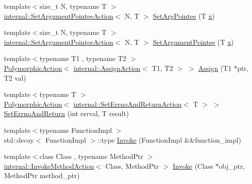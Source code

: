 \begin{DoxyCompactItemize}
\item 
{\footnotesize template$<$size\+\_\+t N, typename T $>$ }\\\mbox{\hyperlink{structtesting_1_1internal_1_1_set_argument_pointee_action}{internal\+::\+Set\+Argument\+Pointee\+Action}}$<$ N, T $>$ \mbox{\hyperlink{namespacetesting_a6dbe77dc170c495ea300dd9d74ed4595}{Set\+Arg\+Pointee}} (T \mbox{\hyperlink{_obj__test_2lib_2googletest-master_2googlemock_2test_2gmock-matchers__test_8cc_a6150e0515f7202e2fb518f7206ed97dc}{x}})
\item 
{\footnotesize template$<$size\+\_\+t N, typename T $>$ }\\\mbox{\hyperlink{structtesting_1_1internal_1_1_set_argument_pointee_action}{internal\+::\+Set\+Argument\+Pointee\+Action}}$<$ N, T $>$ \mbox{\hyperlink{namespacetesting_a470bcfec000440453700ee7a4e301874}{Set\+Argument\+Pointee}} (T \mbox{\hyperlink{_obj__test_2lib_2googletest-master_2googlemock_2test_2gmock-matchers__test_8cc_a6150e0515f7202e2fb518f7206ed97dc}{x}})
\item 
{\footnotesize template$<$typename T1 , typename T2 $>$ }\\\mbox{\hyperlink{classtesting_1_1_polymorphic_action}{Polymorphic\+Action}}$<$ \mbox{\hyperlink{classtesting_1_1internal_1_1_assign_action}{internal\+::\+Assign\+Action}}$<$ T1, T2 $>$ $>$ \mbox{\hyperlink{namespacetesting_a630f14770743960d9d1b7c71cfd9034c}{Assign}} (T1 $\ast$ptr, T2 val)
\item 
{\footnotesize template$<$typename T $>$ }\\\mbox{\hyperlink{classtesting_1_1_polymorphic_action}{Polymorphic\+Action}}$<$ \mbox{\hyperlink{classtesting_1_1internal_1_1_set_errno_and_return_action}{internal\+::\+Set\+Errno\+And\+Return\+Action}}$<$ T $>$ $>$ \mbox{\hyperlink{namespacetesting_a6f466024040fa05349773514ce1c6647}{Set\+Errno\+And\+Return}} (int errval, T result)
\item 
{\footnotesize template$<$typename Function\+Impl $>$ }\\std\+::decay$<$ Function\+Impl $>$\+::type \mbox{\hyperlink{namespacetesting_af5cacf4475557b5a3e37af3836564235}{Invoke}} (Function\+Impl \&\&function\+\_\+impl)
\item 
{\footnotesize template$<$class Class , typename Method\+Ptr $>$ }\\\mbox{\hyperlink{structtesting_1_1internal_1_1_invoke_method_action}{internal\+::\+Invoke\+Method\+Action}}$<$ Class, Method\+Ptr $>$ \mbox{\hyperlink{namespacetesting_af6a7c9befa6ff00198434995586151c3}{Invoke}} (Class $\ast$obj\+\_\+ptr, Method\+Ptr method\+\_\+ptr)

\end{DoxyCompactItemize}
